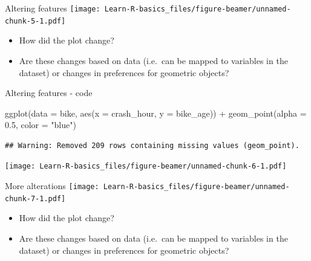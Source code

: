 \documentclass[
  ignorenonframetext,
]{beamer}
\newenvironment{Shaded}{\begin{snugshade}}{\end{snugshade}}
\newcommand{\AttributeTok}[1]{\textcolor[rgb]{0.77,0.63,0.00}{#1}}
\newcommand{\FloatTok}[1]{\textcolor[rgb]{0.00,0.00,0.81}{#1}}
\newcommand{\FunctionTok}[1]{\textcolor[rgb]{0.00,0.00,0.00}{#1}}
\newcommand{\NormalTok}[1]{#1}
\newcommand{\SpecialCharTok}[1]{\textcolor[rgb]{0.00,0.00,0.00}{#1}}
\newcommand{\StringTok}[1]{\textcolor[rgb]{0.31,0.60,0.02}{#1}}
\providecommand{\tightlist}{%
  \setlength{\itemsep}{0pt}\setlength{\parskip}{0pt}}
\begin{document}
\begin{frame}{Altering features}
\protect\hypertarget{altering-features}{}
\texttt{[image: Learn-R-basics\_files/figure-beamer/unnamed-chunk-5-1.pdf]}

\begin{itemize}
\tightlist
\item
  How did the plot change?
\item
  Are these changes based on data (i.e.~can be mapped to variables in
  the dataset) or changes in preferences for geometric objects?
\end{itemize}
\end{frame}

\begin{frame}[fragile]{Altering features - code}
\protect\hypertarget{altering-features---code}{}
\begin{Shaded}
\begin{Highlighting}[]
\FunctionTok{ggplot}\NormalTok{(}\AttributeTok{data =}\NormalTok{ bike, }\FunctionTok{aes}\NormalTok{(}\AttributeTok{x =}\NormalTok{ crash\_hour, }\AttributeTok{y =}\NormalTok{ bike\_age)) }\SpecialCharTok{+}
  \FunctionTok{geom\_point}\NormalTok{(}\AttributeTok{alpha =} \FloatTok{0.5}\NormalTok{, }\AttributeTok{color =} \StringTok{"blue"}\NormalTok{)}
\end{Highlighting}
\end{Shaded}

\begin{verbatim}
## Warning: Removed 209 rows containing missing values (geom_point).
\end{verbatim}

\texttt{[image: Learn-R-basics\_files/figure-beamer/unnamed-chunk-6-1.pdf]}
\end{frame}

\begin{frame}{More alterations}
\protect\hypertarget{more-alterations}{}
\texttt{[image: Learn-R-basics\_files/figure-beamer/unnamed-chunk-7-1.pdf]}

\begin{itemize}
\tightlist
\item
  How did the plot change?
\item
  Are these changes based on data (i.e.~can be mapped to variables in
  the dataset) or changes in preferences for geometric objects?
\end{itemize}
\end{frame}
\end{document}
